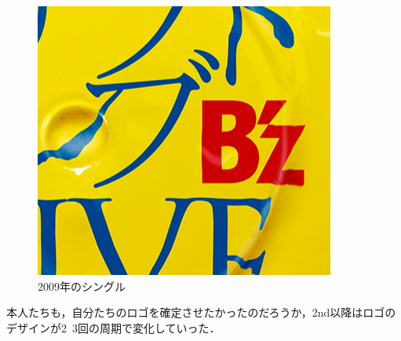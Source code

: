 \documentclass[a4paper,uplatex,dvipdfmx]{jsarticle}
\theoremstyle{definition}
\begin{document}
\begin{figure}[ht]
\begin{minipage}[t]{0.32\columnwidth}
    \centering
    \includegraphics[width=.7\hsize]{fig/Bz/ichibutozenbu.png}
    \caption{2009年のシングル}
    \label{icibutozenbu}
  \end{minipage}
\end{figure}

本人たちも，自分たちのロゴを確定させたかったのだろうか，2nd以降はロゴのデザインが2~3回の周期で変化していった．
\end{document}

